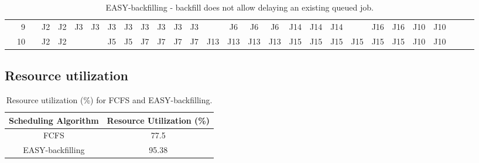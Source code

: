 \documentclass[12pt]{article}
\begin{document}
\begin{table}[h!]
{\begin{tabular}{cc|c|c|c|c|c|c|c|c|c|c|c|c|c|c|c|c|c|c|c|c|c|c|c|c|c|c|}
			\multicolumn{1}{|c}{} & \multicolumn{1}{|r|}{9} &  & J2 & J2 & J3 & J3 & J3 & J3 & J3 & J3 & J3 & J3 &  & J6 & J6 & J6 & J14 & J14 & J14 &  & J16 & J16 & J10 & J10 &  &  &  \\ \cline{2-28}
			\multicolumn{1}{|c}{} & \multicolumn{1}{|r|}{10} &  & J2 & J2 &  &  & J5 & J5 & J7 & J7 & J7 & J7 & J13 & J13 & J13 & J13 & J15 & J15 & J15 & J15 & J15 & J15 & J10 & J10 &  &  &  \\ \hline
		\end{tabular}}
	\label{tab:backfilling}
	\caption{EASY-backfilling - backfill does not allow delaying an existing queued job.}
\end{table}

\subsection*{Resource utilization}

\begin{table}[h!]
	\centering
	\begin{tabular}{|c|c|} 
		\hline
		Scheduling Algorithm & Resource Utilization (\%) \\ [0.5ex] 
		\hline
		FCFS & 77.5 \\
		EASY-backfilling & 95.38 \\
		\hline
	\end{tabular}
	\caption{Resource utilization (\%) for FCFS and EASY-backfilling.}
\end{table}
\end{document}
